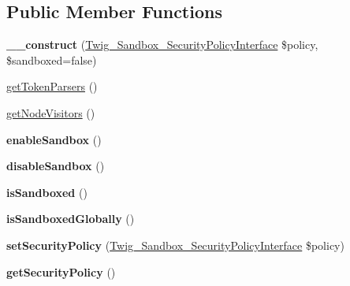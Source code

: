 \subsection*{Public Member Functions}
\begin{DoxyCompactItemize}
\item 
\hypertarget{class_twig___extension___sandbox_ac5ff22259bef44877658cd1480195054}{}{\bfseries \+\_\+\+\_\+construct} (\hyperlink{interface_twig___sandbox___security_policy_interface}{Twig\+\_\+\+Sandbox\+\_\+\+Security\+Policy\+Interface} \$policy, \$sandboxed=false)\label{class_twig___extension___sandbox_ac5ff22259bef44877658cd1480195054}

\item 
\hyperlink{class_twig___extension___sandbox_a8fd35903c3d01c0f0078f59d142eb063}{get\+Token\+Parsers} ()
\item 
\hyperlink{class_twig___extension___sandbox_aec02093179d390d22ae4083f23a1d74a}{get\+Node\+Visitors} ()
\item 
\hypertarget{class_twig___extension___sandbox_a600e5a46866244eeab5d8f636b650038}{}{\bfseries enable\+Sandbox} ()\label{class_twig___extension___sandbox_a600e5a46866244eeab5d8f636b650038}

\item 
\hypertarget{class_twig___extension___sandbox_a67cb7ebf016af9678f9acf281090d5f1}{}{\bfseries disable\+Sandbox} ()\label{class_twig___extension___sandbox_a67cb7ebf016af9678f9acf281090d5f1}

\item 
\hypertarget{class_twig___extension___sandbox_a9ae706ad5e62b4e7370f82b56666719d}{}{\bfseries is\+Sandboxed} ()\label{class_twig___extension___sandbox_a9ae706ad5e62b4e7370f82b56666719d}

\item 
\hypertarget{class_twig___extension___sandbox_aea61ea6174f3aa5ce828eedb89d2687a}{}{\bfseries is\+Sandboxed\+Globally} ()\label{class_twig___extension___sandbox_aea61ea6174f3aa5ce828eedb89d2687a}

\item 
\hypertarget{class_twig___extension___sandbox_a9afe284f8113d071dab789170219913b}{}{\bfseries set\+Security\+Policy} (\hyperlink{interface_twig___sandbox___security_policy_interface}{Twig\+\_\+\+Sandbox\+\_\+\+Security\+Policy\+Interface} \$policy)\label{class_twig___extension___sandbox_a9afe284f8113d071dab789170219913b}

\item 
\hypertarget{class_twig___extension___sandbox_aa36464dbb9342e32f1b6513dc35861b4}{}{\bfseries get\+Security\+Policy} ()\label{class_twig___extension___sandbox_aa36464dbb9342e32f1b6513dc35861b4}


\end{DoxyCompactItemize}
